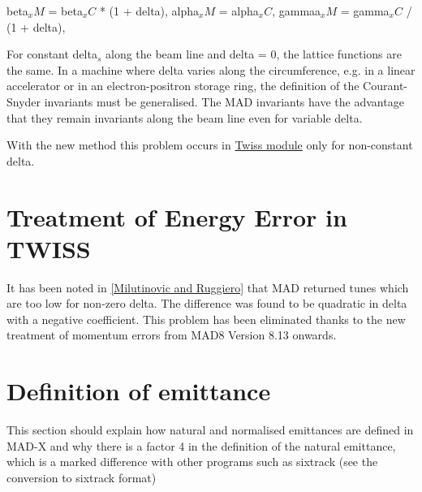 beta$_\textit{x}M$ = beta$_\textit{x}C$ * (1 + delta),
alpha$_\textit{x}M$ = alpha$_\textit{x}C$, gammaa$_\textit{x}M$ =
gamma$_\textit{x}C$ / (1 + delta),  

For constant delta$_\textit{s}$ along the beam line and delta = 0, the
lattice functions are the same. In a machine where delta varies along
the circumference, e.g. in a linear accelerator or in an
electron-positron storage ring, the definition of the Courant-Snyder
invariants must be generalised. The MAD invariants have the advantage
that they remain invariants along the beam line even for variable delta.  

With the new method this problem occurs in
\href{../twiss/twiss.html}{Twiss module} only for non-constant delta.   

\section{Treatment of Energy Error in TWISS} 
It has been noted in \href{bibliography.html#ruggiero}{[Milutinovic and
    Ruggiero]} that MAD returned tunes which are too low for non-zero
delta. The difference was found to be quadratic in delta with a negative
coefficient. This problem has been eliminated thanks to the new
treatment  of momentum errors from MAD8 Version 8.13 onwards.   

\section{Definition of emittance}
This section should explain how natural and normalised emittances are
defined in MAD-X and why there is a factor 4 in the definition of the
natural emittance, which is a marked difference with other programs such
as sixtrack (see the conversion to sixtrack format)


